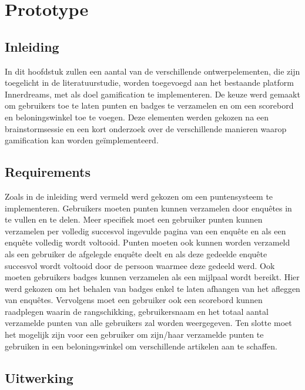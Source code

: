 
\chapter{Prototype}
\label{ch:prototype}

\section{Inleiding}

In dit hoofdstuk zullen een aantal van de verschillende ontwerpelementen, die zijn toegelicht in de literatuurstudie, worden toegevoegd aan het bestaande platform Innerdreams, met als doel gamification te implementeren. De keuze werd gemaakt om gebruikers toe te laten punten en badges te verzamelen en om een scorebord en beloningswinkel toe te voegen. Deze elementen werden gekozen na een brainstormsessie en een kort onderzoek over de verschillende manieren waarop gamification kan worden geïmplementeerd.

\section{Requirements}

Zoals in de inleiding werd vermeld werd gekozen om een puntensysteem te implementeren.  Gebruikers moeten punten kunnen verzamelen door enquêtes in te vullen en te delen. Meer specifiek moet een gebruiker punten kunnen verzamelen per volledig succesvol ingevulde pagina van een enquête en als een enquête volledig wordt voltooid. Punten moeten ook kunnen worden verzameld als een gebruiker de afgelegde enquête deelt en als deze gedeelde enquête succesvol wordt voltooid door de persoon waarmee deze gedeeld werd. Ook moeten gebruikers badges kunnen verzamelen als een mijlpaal wordt bereikt. Hier werd gekozen om het behalen van badges enkel te laten afhangen van het afleggen van enquêtes. Vervolgens moet een gebruiker ook een scorebord kunnen raadplegen waarin de rangschikking, gebruikersnaam en het totaal aantal verzamelde punten van alle gebruikers zal worden weergegeven. Ten slotte moet het mogelijk zijn voor een gebruiker om zijn/haar verzamelde punten te gebruiken in een beloningswinkel om verschillende artikelen aan te schaffen.

\section{Uitwerking}

